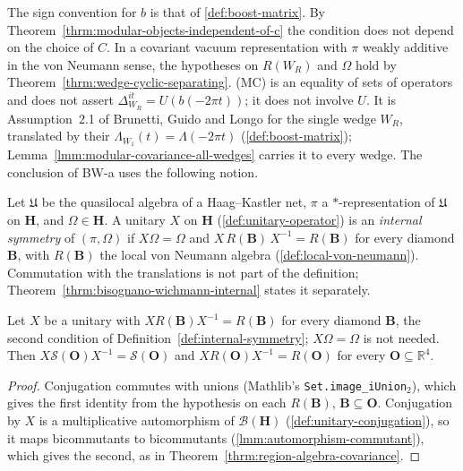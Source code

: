 The sign convention for $b$ is that of \ref{def:boost-matrix}. By Theorem~\ref{thrm:modular-objects-independent-of-c} the condition does not depend on the choice of $C$. In a covariant vacuum representation with $\pi$ weakly additive in the von Neumann sense, the hypotheses on $R(W_R)$ and $\Omega$ hold by Theorem~\ref{thrm:wedge-cyclic-separating}. (MC) is an equality of sets of operators and does not assert $\Delta_{W_R}^{it} = U(b(-2\pi t))$; it does not involve $U$. It is Assumption~2.1 of Brunetti, Guido and Longo for the single wedge $W_R$, translated by their $\Lambda_{W_1}(t) = \Lambda(-2\pi t)$ (\ref{def:boost-matrix}); Lemma~\ref{lmm:modular-covariance-all-wedges} carries it to every wedge. The conclusion of BW-a uses the following notion.

\begin{definition}
    \label{def:internal-symmetry}
    \leanok
    Let $\mathfrak{U}$ be the quasilocal algebra of a Haag--Kastler net, $\pi$ a $*$-representation of $\mathfrak{U}$ on $\mathbf{H}$, and $\Omega \in \mathbf{H}$. A unitary $X$ on $\mathbf{H}$ (\ref{def:unitary-operator}) is an \emph{internal symmetry} of $(\pi, \Omega)$ if $X\Omega = \Omega$ and $X\,R(\mathbf{B})\,X^{-1} = R(\mathbf{B})$ for every diamond $\mathbf{B}$, with $R(\mathbf{B})$ the local von Neumann algebra (\ref{def:local-von-neumann}). Commutation with the translations is not part of the definition; Theorem~\ref{thrm:bisognano-wichmann-internal} states it separately.
\end{definition}

\begin{lemma}
    \label{lmm:internal-symmetry-normalizes-regions}
    \leanok
    Let $X$ be a unitary with $XR(\mathbf{B})X^{-1} = R(\mathbf{B})$ for every diamond $\mathbf{B}$, the second condition of Definition~\ref{def:internal-symmetry}; $X\Omega = \Omega$ is not needed. Then $X\mathcal{S}(\mathbf{O})X^{-1} = \mathcal{S}(\mathbf{O})$ and $XR(\mathbf{O})X^{-1} = R(\mathbf{O})$ for every $\mathbf{O} \subseteq \mathbb{R}^4$.
\end{lemma}
\begin{proof}
    \leanok
    Conjugation commutes with unions (Mathlib's \texttt{Set.image\_iUnion\ensuremath{_2}}), which gives the first identity from the hypothesis on each $R(\mathbf{B})$, $\mathbf{B} \subseteq \mathbf{O}$. Conjugation by $X$ is a multiplicative automorphism of $\mathcal{B}(\mathbf{H})$ (\ref{def:unitary-conjugation}), so it maps bicommutants to bicommutants (\ref{lmm:automorphism-commutant}), which gives the second, as in Theorem~\ref{thrm:region-algebra-covariance}.
\end{proof}

